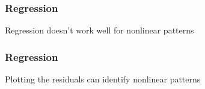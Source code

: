 \documentclass[handout]{beamer}
\begin{document}


   \begin{frame}
   \frametitle{Regression}
   \begin{center}
   \end{center}
   Regression doesn't work well for nonlinear patterns
   \end{frame}



   \begin{frame}
   \frametitle{Regression}
   \begin{center}
   \end{center}
   Plotting the residuals can identify nonlinear patterns
   \end{frame}

\end{document}
